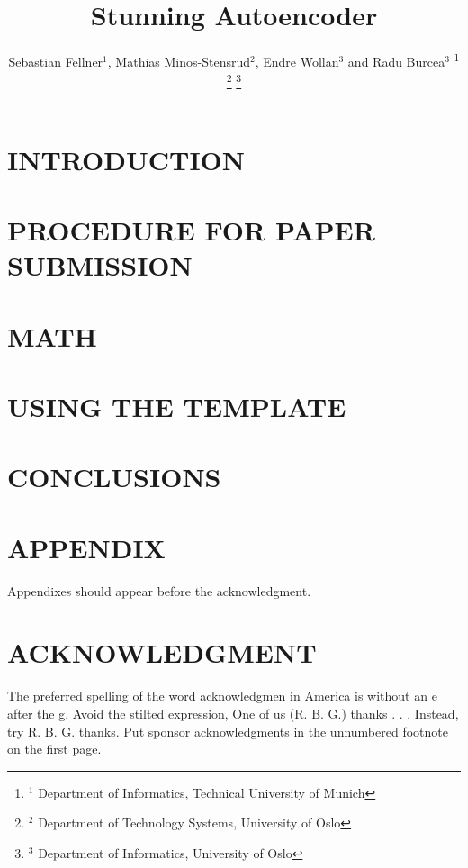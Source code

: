 \documentclass[a4paper, 10pt, conference]{ieeeconf}      %
\title{\LARGE \bf
Stunning Autoencoder
}
\author{Sebastian Fellner$^{1}$, Mathias Minos-Stensrud$^{2}$, Endre Wollan$^{3}$ and Radu Burcea$^{3}$%
%
\thanks{$^{1}$ Department of Informatics, Technical University of Munich}%
\thanks{$^{2}$ Department of Technology Systems, University of Oslo}%
\thanks{$^{3}$ Department of Informatics, University of Oslo}%
}
\begin{document}
\maketitle
\thispagestyle{empty}
\pagestyle{empty}

\begin{abstract}

\end{abstract}

\section{INTRODUCTION}


\section{PROCEDURE FOR PAPER SUBMISSION}


\section{MATH}


\section{USING THE TEMPLATE}


\section{CONCLUSIONS}



\addtolength{\textheight}{-12cm}   
                                  
\section*{APPENDIX}
Appendixes should appear before the acknowledgment.

\section*{ACKNOWLEDGMENT}
The preferred spelling of the word acknowledgmen in America is without an e after the g. Avoid the stilted expression, One of us (R. B. G.) thanks . . .  Instead, try R. B. G. thanks. Put sponsor acknowledgments in the unnumbered footnote on the first page.



\end{document}

